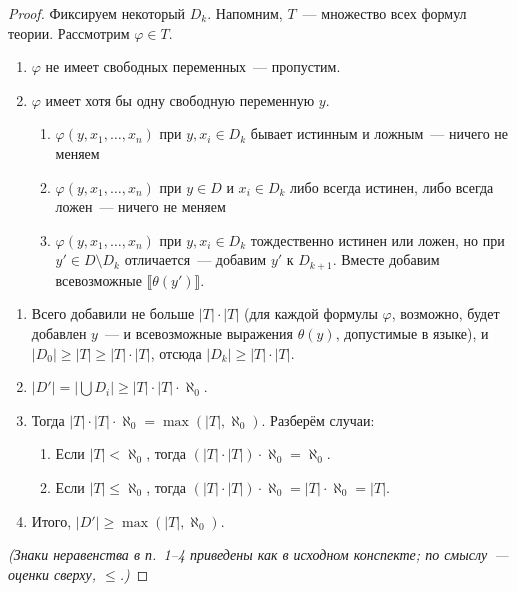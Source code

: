 \documentclass[a4paper,11pt]{article}
\theoremstyle{definition}
\begin{document}
\begin{proof}
Фиксируем некоторый $D_k$. Напомним, $T$~--- множество всех формул теории.
Рассмотрим $\varphi \in T$.
\begin{enumerate}
\item $\varphi$ не имеет свободных переменных~--- пропустим.
\item $\varphi$ имеет хотя бы одну свободную переменную $y$.
  \begin{enumerate}
  \item $\varphi(y, x_1, \dots, x_n)$ при $y, x_i \in D_k$ бывает истинным и
    ложным~--- ничего не меняем
  \item $\varphi(y, x_1, \dots, x_n)$ при $y \in D$ и $x_i \in D_k$ либо всегда
    истинен, либо всегда ложен~--- ничего не меняем
  \item $\varphi(y, x_1, \dots, x_n)$ при $y, x_i \in D_k$ тождественно истинен
    или ложен, но при $y' \in D \setminus D_k$ отличается~--- добавим $y'$ к
    $D_{k+1}$. Вместе добавим всевозможные $\llbracket\theta(y')\rrbracket$.
  \end{enumerate}
\end{enumerate}
\begin{enumerate}
\item Всего добавили не больше $|T| \cdot |T|$ (для каждой формулы $\varphi$,
  возможно, будет добавлен $y$~--- и всевозможные выражения $\theta(y)$,
  допустимые в языке), и $|D_0| \ge |T| \ge |T| \cdot |T|$, отсюда $|D_k| \ge
  |T| \cdot |T|$.
\item $|D'| = |\bigcup D_i| \ge |T| \cdot |T| \cdot \aleph_0$.
\item Тогда $|T| \cdot |T| \cdot \aleph_0 = \max(|T|, \aleph_0)$. Разберём
  случаи:
  \begin{enumerate}
  \item Если $|T| < \aleph_0$, тогда $(|T| \cdot |T|) \cdot \aleph_0 = \aleph_0$.
  \item Если $|T| \le \aleph_0$, тогда $(|T| \cdot |T|) \cdot \aleph_0 = |T|
    \cdot \aleph_0 = |T|$.
  \end{enumerate}
\item Итого, $|D'| \ge \max(|T|, \aleph_0)$.
\end{enumerate}
\emph{(Знаки неравенства в п.\ 1--4 приведены как в исходном конспекте; по
смыслу~--- оценки сверху, $\le$.)}


\end{proof}
\end{document}

